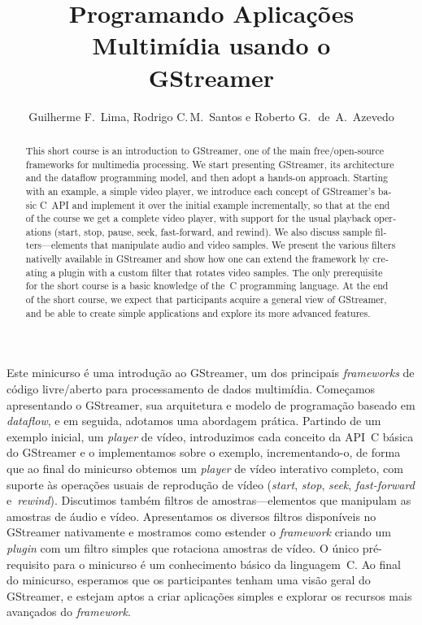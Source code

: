 \documentclass{SBCbookchapter}
\title{Programando Aplicações Multimídia usando o\\GStreamer}
\author{Guilherme F.~Lima, Rodrigo C.\,M.~Santos e Roberto
G.\,~de~A.~Azevedo}
\begin{document}
\maketitle
\begin{abstract}
\begin{otherlanguage}{english}
This short course is an introduction to GStreamer, one of the main
free/open-source frameworks for multimedia processing.  We start presenting
GStreamer, its architecture and the dataflow programming model, and then adopt
a hands-on approach.  Starting with an example, a simple video player, we
introduce each concept of GStreamer's basic C~API and implement it over the
initial example incrementally, so that at the end of the course we get a
complete video player, with support for the usual playback operations
(start, stop, pause, seek, fast-forward, and rewind).  We also discuss
sample filters---elements that manipulate audio and video samples.  We
present the various filters nativelly available in GStreamer and show how one
can extend the framework by creating a plugin with a custom filter that rotates
video samples.  The only prerequisite for the short course is a basic knowledge
of the~C programming language.  At the end of the short course, we expect that
participants acquire a general view of GStreamer, and be able to create
simple applications and explore its more advanced features.
\end{otherlanguage}
\end{abstract}

\begin{resumo}
Este minicurso é uma introdução ao GStreamer, um dos principais
\emph{frameworks} de código livre/aberto para processamento de dados
multimídia.  Começamos apresentando o GStreamer, sua arquitetura e modelo de
programação baseado em \emph{dataflow}, e em seguida, adotamos uma abordagem
prática.  Partindo de um exemplo inicial, um \emph{player} de vídeo,
introduzimos cada conceito da API~C básica do GStreamer e o implementamos
sobre o exemplo, incrementando-o, de forma que ao final do minicurso obtemos
um \emph{player} de vídeo interativo completo, com suporte às
operações usuais de reprodução de vídeo (\emph{start}, \emph{stop},
\emph{seek}, \emph{fast-forward} e~\emph{rewind}).  Discutimos também filtros
de amostras---elementos que manipulam as amostras de áudio e vídeo.
Apresentamos os diversos filtros disponíveis no GStreamer nativamente e
mostramos como estender o \emph{framework} criando um \emph{plugin} com um
filtro simples que rotaciona amostras de vídeo.  O único pré-requisito para o
minicurso é um conhecimento básico da linguagem~C.  Ao final do minicurso,
esperamos que os participantes tenham uma visão geral do GStreamer, e estejam
aptos a criar aplicações simples e explorar os recursos mais avançados do
\emph{framework}.
\end{resumo}
\end{document}
